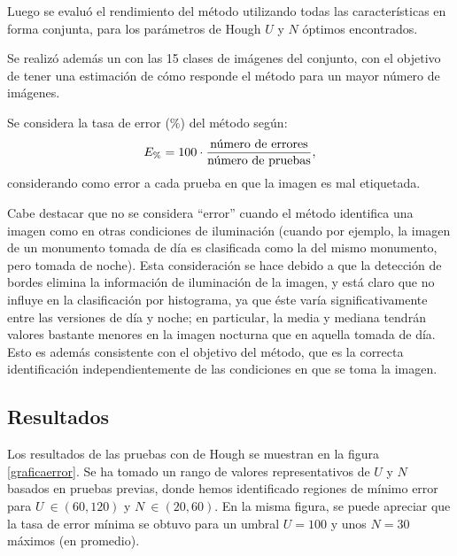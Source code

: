 \documentclass[conference,a4paper,10pt,oneside,final]{tfmpd}
\begin{document}
Luego se evaluó el rendimiento del método utilizando todas las características %
en forma conjunta, para los parámetros de Hough $U$ y $N$ óptimos encontrados.

Se realizó además un  con las 15 clases de
imágenes del conjunto,
con el objetivo de tener una estimación de cómo responde
el método para un mayor número de imágenes.

Se considera la tasa de error ($\%$) del método según:
\begin{equation}
E_\%=100\cdot\frac{\textrm{número de errores}}{\textrm{número de pruebas}},
\end{equation}
considerando como error a cada prueba en que la imagen es mal etiquetada.

Cabe destacar que no se considera %
``error'' %
cuando el método identifica
una imagen como  en otras
condiciones de iluminación (cuando por ejemplo, la imagen de un monumento
tomada de día es clasificada como la del mismo monumento, pero tomada de noche).
Esta consideración se hace debido a que la detección de bordes elimina la
información de iluminación de la imagen, y está claro que no influye
en la clasificación por histograma, ya que éste varía significativamente
entre las versiones de día y noche; en particular, la media y mediana tendrán
valores bastante menores en la imagen nocturna que en aquella tomada de día.
Esto es además consistente con el objetivo del método, que es la correcta
identificación independientemente de las condiciones en que se toma la imagen.
%
%
\subsection{Resultados}
Los resultados de las pruebas con  de Hough
se muestran en la figura
\ref{graficaerror}. Se ha tomado un rango de valores representativos de $U$
y $N$ basados en pruebas previas, donde hemos identificado regiones de mínimo
error para $U~\in(60,120)$ y $N~\in(20,60)$.
En la misma figura, se puede apreciar que la tasa de error mínima se obtuvo
para un umbral $U = 100$ y unos $N = 30$ máximos (en promedio).
\end{document}
